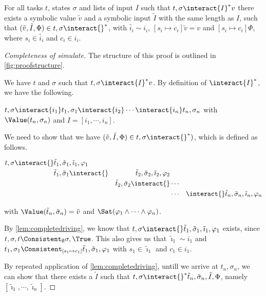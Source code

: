 \begin{lemma}
  \label{lem:completesimulate}
  For all tasks $t$, states $\sigma$ and lists of input $I$
  such that $t,\sigma\interact{I}^*v$
  there exists a symbolic value $\tilde{v}$ and a symbolic input $\tilde{I}$ with the same length as $I$,
  such that $(\tilde{v},\tilde{I},\Phi)\in t,\sigma\interact{}^*$,
  with $\tilde{i_i}\sim i_i$, $[s_i\mapsto c_i]\tilde{v}=v$ and $[s_i\mapsto c_i]\Phi$,
  where $s_i\in\tilde{i_i}$ and $c_i\in i_i$.
\end{lemma}

\begin{proof}[Completeness of simulate]
  The structure of this proof is outlined in \cref{fig:proofstructure}.

  We have $t$ and $\sigma$ such that $t,\sigma\interact{I}^*v$.
  By definition of $\interact{I}^*$, we have the following.

  $t,\sigma\interact{i_1}t_1,\sigma_1\interact{i_2}\cdots \interact{i_n}t_n,\sigma_n$ with $\Value(t_n,\sigma_n)$ and $I=[i_1,\cdots,i_n]$.

  We need to show that we have $(\tilde{v},\tilde{I},\Phi)\in t,\sigma\interact{}^*)$,
  which is defined as follows.

  \begin{align*}
      t,\sigma\interact{}&\tilde{t}_1,\tilde{\sigma}_1,\tilde{\imath}_1,\phi_1&\\
                      &\tilde{t}_1,\tilde{\sigma}_1\interact{}&\tilde{t}_2,\tilde{\sigma}_2,\tilde{\imath}_2,\phi_2\\
                      &                                    &\tilde{t}_2,\tilde{\sigma}_2\interact{}&\cdots&\\
                      &                                    &                                    &\cdots&
                      \interact{}\tilde{t}_n,\tilde{\sigma}_n,\tilde{\imath}_n,\phi_n
  \end{align*}

  with $\Value(\tilde{t}_n,\tilde{\sigma}_n)=\tilde{v}$ and $\Sat(\phi_1\land\cdots\land\phi_n)$.

  By \cref{lem:completedriving}, we know that $t,\sigma\interact{}\tilde{t}_1,\tilde{\sigma}_1,\tilde{\imath}_1,\phi_1$ exists,
  since $t,\sigma,t\Consistent_{\emptyset}\sigma,\True$.
  This also gives us that $\tilde{\imath}_1\sim i_1$ and $t_1,\sigma_1\Consistent_{[s_1\mapsto c_1]}\tilde{t}_1,\tilde{\sigma}_1,\phi_1$ with $s_1\in\tilde{\imath}_1$ and $c_1\in i_1$.

  By repeated application of \cref{lem:completedriving}, untill we arrive at $t_n,\sigma_n$,
  we can show that there exists a $\tilde{I}$ such that $t,\sigma\interact{}^*\tilde{t}_n,\tilde{\sigma}_n,\tilde{I},\Phi$,
  namely $[\tilde{\imath}_1,\cdots,\tilde{\imath}_n]$.

\end{proof}

